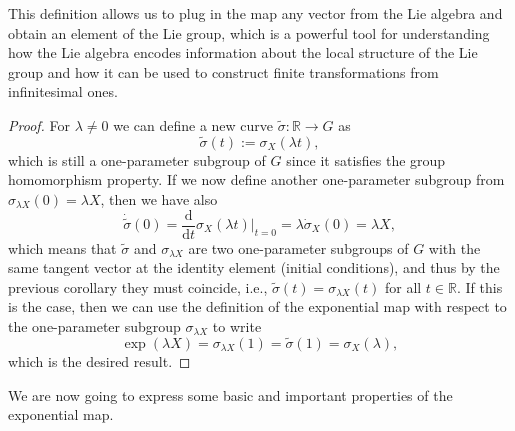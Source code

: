This definition allows us to plug in the map any vector from the Lie algebra and obtain an element of the Lie group, which is a powerful tool for understanding how the Lie algebra encodes information about the local structure of the Lie group and how it can be used to construct finite transformations from infinitesimal ones.

\begin{proof}
    For \(\lambda \neq 0\) we can define a new curve \(\tilde{\sigma} : \mathbb{R} \to G\) as
    \[
        \tilde{\sigma}(t) := \sigma_X(\lambda t),
    \]
    which is still a one-parameter subgroup of \(G\) since it satisfies the group homomorphism property. If we now define another one-parameter subgroup from \(\sigma_{\lambda X}(0) = \lambda X \), then we have also
    \[
        \dot{\tilde{\sigma}}(0) = \frac{\mathrm{d}}{\mathrm{d} t} \sigma_X(\lambda t) \bigg|_{t=0} = \lambda \dot{\sigma}_X(0) = \lambda X,
    \]
    which means that \(\tilde{\sigma}\) and \(\sigma_{\lambda X}\) are two one-parameter subgroups of \(G\) with the same tangent vector at the identity element (initial conditions), and thus by the previous corollary they must coincide, i.e., \(\tilde{\sigma}(t) = \sigma_{\lambda X}(t)\) for all \(t \in \mathbb{R}\). If this is the case, then we can use the definition of the exponential map with respect to the one-parameter subgroup \(\sigma_{\lambda X}\) to write
    \[
        \exp(\lambda X) = \sigma_{\lambda X}(1) = \tilde{\sigma}(1) = \sigma_X(\lambda),
    \]
    which is the desired result.
\end{proof}

We are now going to express some basic and important properties of the exponential map.

